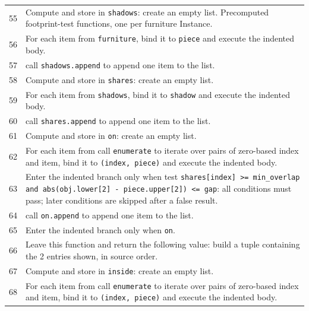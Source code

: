 \documentclass[11pt,a4paper]{book}
\begin{document}
\begin{longtable}{r p{}}
55 & Compute and store in \texttt{shadows}: create an empty list. Precomputed footprint-test functions, one per furniture Instance. \\

56 & For each item from \texttt{furniture}, bind it to \texttt{piece} and execute the indented body. \\

57 & call \texttt{shadows.append} to append one item to the list. \\

58 & Compute and store in \texttt{shares}: create an empty list.  \\

59 & For each item from \texttt{shadows}, bind it to \texttt{shadow} and execute the indented body. \\

60 & call \texttt{shares.append} to append one item to the list. \\

61 & Compute and store in \texttt{on}: create an empty list.  \\

62 & For each item from call \texttt{enumerate} to iterate over pairs of zero-based index and item, bind it to \texttt{(index, piece)} and execute the indented body. \\

63 & Enter the indented branch only when test \texttt{shares[index] >= min\_overlap and abs(obj.lower[2] - piece.upper[2]) <= gap}: all conditions must pass; later conditions are skipped after a false result. \\

64 & call \texttt{on.append} to append one item to the list. \\

65 & Enter the indented branch only when \texttt{on}. \\

66 & Leave this function and return the following value: build a tuple containing the 2 entries shown, in source order. \\

67 & Compute and store in \texttt{inside}: create an empty list.  \\

68 & For each item from call \texttt{enumerate} to iterate over pairs of zero-based index and item, bind it to \texttt{(index, piece)} and execute the indented body. \\


\end{longtable}
\end{document}
